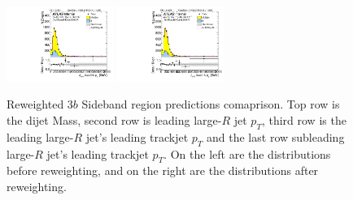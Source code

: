 \begin{figure}[htbp!]
\begin{center}
\includegraphics[angle=270, width=0.31\textwidth]{./figures/boosted/Prereweight/Moriond_ThreeTag_Sideband_sublHCand_trk0_Pt.pdf}
\includegraphics[angle=270, width=0.31\textwidth]{./figures/boosted/Sideband/b77_ThreeTag_Sideband_sublHCand_trk0_Pt.pdf}\\
\caption{Reweighted 3$b$ Sideband region predictions comaprison. Top row is the dijet Mass, second row is leading large-$R$ jet $p_{T}$, third row is the leading large-$R$ jet's leading trackjet $p_T$ and the last row subleading large-$R$ jet's leading trackjet $p_T$. On the left are the distributions before reweighting, and on the right are the distributions after reweighting.}
\label{fig:rw-3b-comp-sb}
\end{center}
\end{figure}


